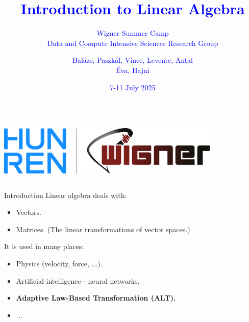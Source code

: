 \documentclass{beamer}
\title{\textcolor{blue}{Introduction to Linear Algebra}}
\subtitle{\textcolor{blue}{Wigner Summer Camp \\ Data and Compute Intensive Sciences Research Group}}
\author{\textcolor{blue}{Balázs, Paszkál, Vince, Levente, Antal \\ Éva, Hajni}}
\date{\textcolor{blue}{7-11 July 2025}}
\begin{document}
\begin{frame}
  \titlepage
  \begin{columns}
    \centering
    \centering
    \includegraphics[width=0.8\textwidth]{img/logo.png}
    \centering
  \end{columns}
\end{frame}

\begin{frame}{Introduction}
    Linear algebra deals with:
    \begin{itemize}
        \item Vectors.
        \item Matrices. (The linear transformations of vector spaces.)
    \end{itemize}

    It is used in many places:
    \begin{itemize}
        \item Physics (velocity, force, ...).
        \item Artificial intelligence - neural networks.
        \item \textbf{Adaptive Law-Based Transformation (ALT).} 
        \item ...
    \end{itemize}
\end{frame}
\end{document}
